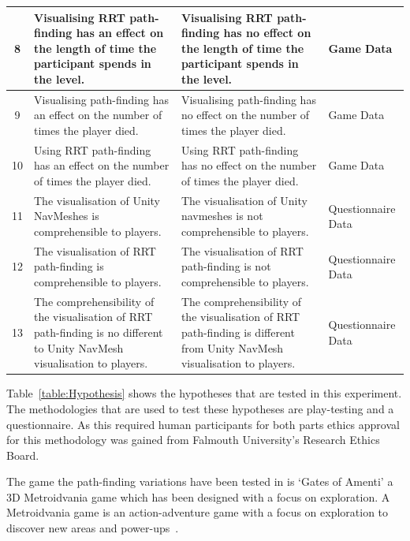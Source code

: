 \documentclass[journal]{IEEEtran}
\begin{document}
\begin{table}[h]
\begin{tabular}{|c|p{7cm}|p{7cm}|p{1.75cm}|}
			8 & Visualising RRT path-finding has an effect on the length of time the participant spends in the level. 
			& Visualising RRT path-finding has no effect on the length of time the participant spends in the level.
			& Game Data \\ \hline
			
			9 & Visualising path-finding has an effect on the number of times the player died. 
			& Visualising path-finding has no effect on the number of times the player died.  
			& Game Data \\ \hline
			
			10 & Using RRT path-finding has an effect on the number of times the player died. 
			& Using RRT path-finding has no effect on the number of times the player died.  
			& Game Data \\ \hline
			
			
			11 &   The visualisation of  Unity NavMeshes is comprehensible to players.
			&  The visualisation of  Unity navmeshes is not comprehensible to players.
			& Questionnaire Data \\ \hline
			
			12 &  The visualisation of  RRT path-finding is comprehensible to players.
			&  The visualisation of  RRT path-finding is not comprehensible to players.
			& Questionnaire Data \\ \hline
			
			13 &  The comprehensibility of the visualisation of RRT path-finding is no different to Unity NavMesh visualisation to players.
			&  The comprehensibility of the visualisation of RRT path-finding is different from Unity NavMesh visualisation to players.
			& Questionnaire Data \\ \hline
		\end{tabular}
	\end{table}
	Table~\ref{table:Hypothesis} shows the hypotheses that are tested in this experiment. The methodologies that are used to test these hypotheses are play-testing and a questionnaire. As this required human participants for both parts ethics approval for this methodology was gained from Falmouth University’s Research Ethics Board.
	
	The game the path-finding variations have been tested in is `Gates of Amenti' a 3D Metroidvania game which has been designed with a focus on exploration. A Metroidvania game is an action-adventure game with a focus on exploration to discover new areas and power-ups~\cite{online:metroidvania}.
	
\end{document}

